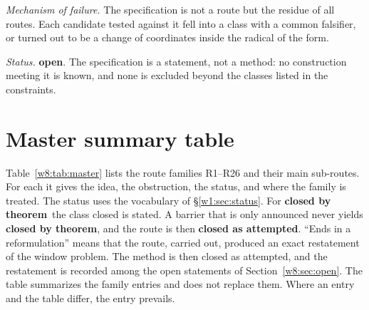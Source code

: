 \documentclass[11pt]{amsart}
\theoremstyle{definition}
\theoremstyle{remark}
\numberwithin{equation}{section}
\newcommand{\rtag}[1]{\textbf{\small\textsf{#1}}}
\newcommand{\closedT}{\rtag{closed by theorem}}
\newcommand{\closedA}{\rtag{closed as attempted}}
\newcommand{\openR}{\rtag{open}}
\newcommand{\entry}[1]{\par\smallskip\noindent\textit{#1.}\enspace}
\begin{document}
\entry{Mechanism of failure} The specification is not a route but the residue of all routes. Each candidate tested
against it fell into a class with a common falsifier, or turned out to be a change of coordinates inside the radical
of the form.

\entry{Status} \openR. The specification is a statement, not a method: no construction meeting it is known, and none
is excluded beyond the classes listed in the constraints.


\section{Master summary table}\label{w8:sec:table}

Table~\ref{w8:tab:master} lists the route families R1--R26 and their main sub-routes. For each it gives the idea, the
obstruction, the status, and where the family is treated. The status uses the vocabulary of
\S\ref{w1:sec:status}. For \closedT\ the class closed is stated. A barrier that is only announced never yields
\closedT, and the route is then \closedA. ``Ends in a reformulation'' means that the route, carried out, produced an
exact restatement of the window problem. The method is then closed as attempted, and the restatement is recorded among
the open statements of Section~\ref{w8:sec:open}. The table summarizes the family entries and does not replace them.
Where an entry and the table differ, the entry prevails.
\end{document}
